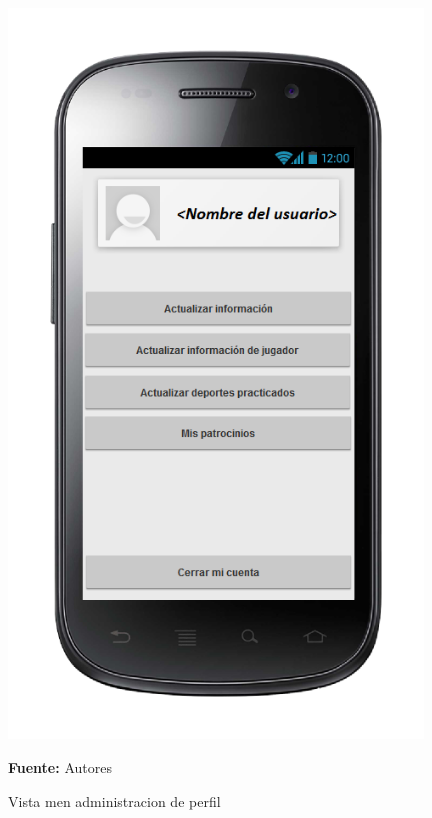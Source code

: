 \begin{figure}[!htb]
  \begin{center}
\includegraphics[width=11cm]{./imagenes/UI/Usuarios/menu_administracion_de_perfil.png}
    \caption{Vista men administracion de perfil}
    \label{fig:Vista_menu_administracion_de_perfil}
    \textbf{Fuente:}  Autores
  \end{center}
\end{figure}
